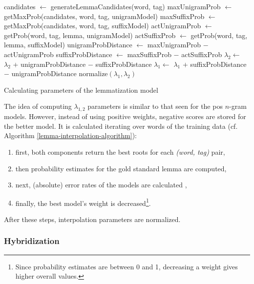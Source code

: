\begin{algorithm*}
\begin{algorithmic}
        \State candidates $\gets$ generateLemmaCandidates(word, tag)
        \State maxUnigramProb $\gets$ getMaxProb(candidates, word, tag, unigramModel)
        \State maxSuffixProb $\gets$ getMaxProb(candidates, word, tag, suffixModel)
        \State actUnigramProb $\gets$ getProb(word, tag, lemma, unigramModel)
        \State actSuffixProb $\gets$ getProb(word, tag, lemma, suffixModel)
        \State unigramProbDistance $\gets$ maxUnigramProb $-$ actUnigramProb
        \State suffixProbDistance $\gets$ maxSuffixProb $-$ actSuffixProb
            \State $\lambda_{2} \gets$ $\lambda_{2}$ $+$ unigramProbDistance $-$ suffixProbDistance
        \Else%
            \State $\lambda_{1} \gets$ $\lambda_{1}$ $+$ suffixProbDistance $-$ unigramProbDistance
        \EndIf
    \EndFor
    \State normalize$( \lambda_{1}, \lambda_{2} )$
  \end{algorithmic}
  \caption{Calculating parameters of the lemmatization model}
\label{lemma-interpolation-algorithm}
\end{algorithm*}

The idea of computing $\lambda_{1,2}$ parameters is similar to that seen for the \gls{pos} $n$-gram models. 
However, instead of using positive weights, negative scores are stored for the better model.  
It is calculated iterating over words of the training data (cf. Algorithm \ref{lemma-interpolation-algorithm}):
\begin{enumerate}
  \item first, both components return the best roots for each \emph{(word, tag)} pair, 
  \item then probability estimates for the gold standard lemma are computed,
  \item next, (absolute) error rates of the models are calculated ,
  \item finally, the best model’s weight is decreased\footnote{Since probability estimates are between 0 and 1, decreasing a weight gives higher overall values.}.
\end{enumerate}
After these steps, interpolation parameters are normalized.


\subsubsection{Hybridization}

